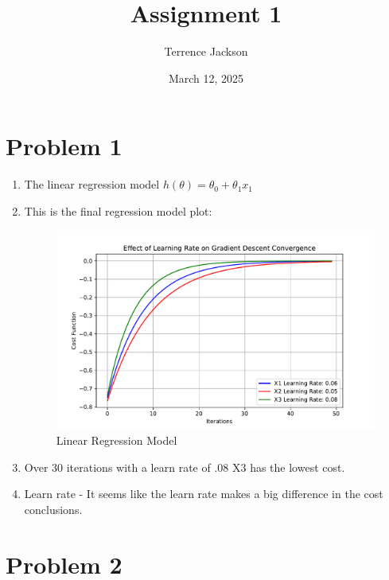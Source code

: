 \documentclass{article}
\date{March 12, 2025}
\title{Assignment 1}
\author{Terrence Jackson}
\begin{document}
\maketitle

\section{Problem 1}


\begin{enumerate}
    \item The linear regression model $ h(\theta) = \theta_0 + \theta_1x_1 $ 

    \item This is the final regression model plot: 

    \begin{figure}[h]
        \centering
        \includegraphics[width=0.9 \linewidth]{ECGR5105/regressionModel.pdf}
        \caption{\label{fig:graph} Linear Regression Model }
    \end{figure}

    \item Over 30 iterations with a learn rate of .08 X3 has the lowest cost.
    \item Learn rate - It seems like the learn rate makes a big difference in the cost conclusions. 


\end{enumerate}

 
\section{Problem 2}
\end{document}
